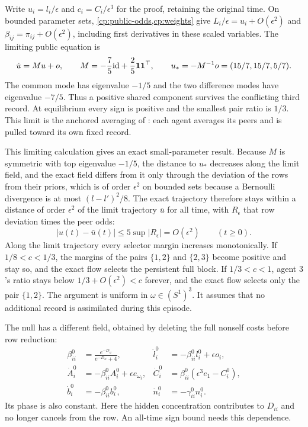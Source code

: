 Write $u_i=l_i/\epsilon$ and $c_i=C_i/\epsilon^3$ for the proof, retaining the original time. On bounded parameter sets, \cref{cp:public-odds,cp:weights} give $L_i/\epsilon=u_i+O(\epsilon^2)$ and $\beta_{ij}=\pi_{ij}+O(\epsilon^2)$, including first derivatives in these scaled variables. The limiting public equation is
\begin{equation}
 \dot u=Mu+o,\qquad
 M=-\frac75\mathrm{id}+\frac25\mathbf1\mathbf1^\top,\qquad
 u_*=-M^{-1}o=(15/7,15/7,5/7).
 \label{cp:affine}
\end{equation}
The common mode has eigenvalue $-1/5$ and the two difference modes have eigenvalue $-7/5$. Thus a positive shared component survives the conflicting third record. At equilibrium every sign is positive and the smallest pair ratio is $1/3$. This limit is the anchored averaging of \citet{FriedkinJohnsen1990}: each agent averages its peers and is pulled toward its own fixed record.

This limiting calculation gives an exact small-parameter result. Because $M$ is symmetric with top eigenvalue $-1/5$, the distance to $u_*$ decreases along the limit field, and the exact field differs from it only through the deviation of the rows from their priors, which is of order $\epsilon^2$ on bounded sets because a Bernoulli divergence is at most $(l-l')^2/8$. The exact trajectory therefore stays within a distance of order $\epsilon^2$ of the limit trajectory $\bar u$ for all time, with $R_\epsilon$ that row deviation times the peer odds:
\begin{equation}
 |u(t)-\bar u(t)|\leq5\sup|R_\epsilon|=O(\epsilon^2)\qquad(t\geq0).
 \label{cp:attraction}
\end{equation}
Along the limit trajectory every selector margin increases monotonically. If $1/8<c<1/3$, the margins of the pairs $\{1,2\}$ and $\{2,3\}$ become positive and stay so, and the exact flow selects the persistent full block. If $1/3<c<1$, agent $3$'s ratio stays below $1/3+O(\epsilon^2)<c$ forever, and the exact flow selects only the pair $\{1,2\}$. The argument is uniform in $\omega\in(S^1)^3$. It assumes that no additional record is assimilated during this episode.

The null has a different field, obtained by deleting the full nonself costs before row reduction:
\begin{equation}
 \begin{aligned}
 \beta_{ii}^0&=\frac{e^{-D_{ii}}}{e^{-D_{ii}}+4},&
 \dot l_i^0&=-\beta_{ii}^0l_i^0+\epsilon o_i,\\
 \dot A_i^0&=-\beta_{ii}^0A_i^0+\epsilon e_{\omega_i},&
 \dot C_i^0&=\beta_{ii}^0(\epsilon^3e_1-C_i^0),\\
 \dot b_i^0&=-\beta_{ii}^0b_i^0,&
 \dot n_i^0&=-\gamma_{ii}^0n_i^0.
 \end{aligned}
 \label{cp:null-parameters}
\end{equation}
Its phase is also constant. Here the hidden concentration contributes to $D_{ii}$ and no longer cancels from the row. An all-time sign bound needs this dependence.

